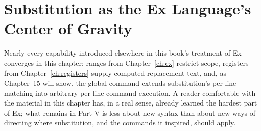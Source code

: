 \section{Substitution as the Ex Language's Center of Gravity}

Nearly every capability introduced elsewhere in this book's treatment of Ex converges in this chapter: ranges from Chapter~\ref{ch:ex} restrict scope, registers from Chapter~\ref{ch:registers} supply computed replacement text, and, as Chapter~15 will show, the global command extends substitution's per-line matching into arbitrary per-line command execution. A reader comfortable with the material in this chapter has, in a real sense, already learned the hardest part of Ex; what remains in Part V is less about new syntax than about new ways of directing where substitution, and the commands it inspired, should apply.
